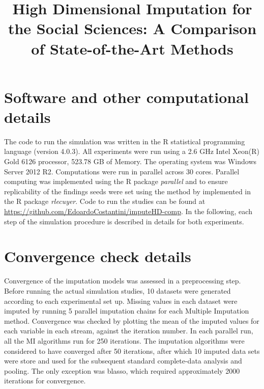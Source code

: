 \documentclass[]{./cls/interact}
\theoremstyle{plain}
\theoremstyle{definition}
\theoremstyle{remark}
\begin{document}

\title{High Dimensional Imputation for the Social Sciences: A Comparison of State-of-the-Art Methods}

\author{
}

\maketitle

\section{Software and other computational details}

The code to run the simulation was written in the R statistical programming language (version 4.0.3). 
All experiments were run using a 2.6 GHz Intel Xeon(R) Gold 6126 processor, 523.78 GB of Memory. The
operating system was Windows Server 2012 R2.
Computations were run in parallel across 30 cores. 
Parallel computing was implemented using the R package \emph{parallel} and to ensure replicability 
of the findings seeds were set using the method by \cite{lecuyer:2002} implemented in the R package 
\emph{rlecuyer}.
Code to run the studies can be found at \url{https://github.com/EdoardoCostantini/imputeHD-comp}.
In the following, each step of the simulation procedure is described in details for both experiments.

\section{Convergence check details}

	Convergence of the imputation models was assessed in a preprocessing step.
	Before running the actual simulation studies, 10 datasets were generated according to each experimental set up.
	Missing values in each dataset were imputed by running 5 parallel imputation chains for each Multiple Imputation 
	method.
	Convergence was checked by plotting the mean of the imputed values for each variable in each stream, against the 
	iteration number.
	In each parallel run, all the MI algorithms run for 250 iterations.
	The imputation algorithms were considered to have converged after 50 iterations, after which 10 imputed data 
	sets were store and used for the subsequent standard complete-data analysis and pooling.
	The only exception was blasso, which required approximately 2000 iterations for convergence.
\end{document}
